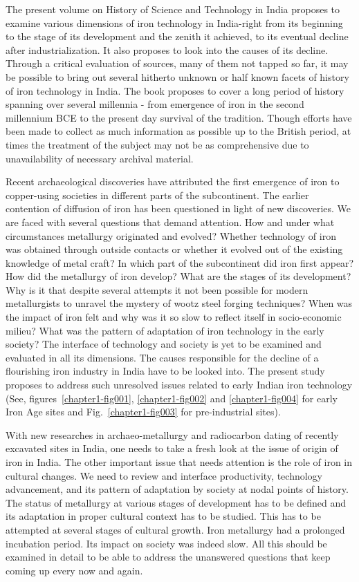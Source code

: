 The present volume on History of Science and Technology in India proposes to examine various dimensions of iron technology in India-right from its beginning to the stage of its development and the zenith it achieved, to its eventual decline after industrialization. It also proposes to look into the causes of its decline. Through a critical evaluation of sources, many of them not tapped so far, it may be possible to bring out several hitherto unknown or half known facets of history of iron technology in India. The book proposes to cover a long period of history spanning over several millennia - from emergence of iron in the second millennium BCE to the present day survival of the tradition. Though efforts have been made to collect as much information as possible up to the British period, at times the treatment of the subject may not be as comprehensive due to unavailability of necessary archival material.

Recent archaeological discoveries have attributed the first emergence of iron to copper-using societies in different parts of the subcontinent. The earlier contention of diffusion of iron has been questioned in light of new discoveries. We are faced with several questions that demand attention. How and under what circumstances metallurgy originated and evolved? Whether technology of iron was obtained through outside contacts or whether it evolved out of the existing knowledge of metal craft? In which part of the subcontinent did iron first appear? How did the metallurgy of iron develop? What are the stages of its development? Why is it that despite several attempts it not been possible for modern metallurgists to unravel the mystery of wootz steel forging techniques? When was the impact of iron felt and why was it so slow to reflect itself in socio-economic milieu? What was the pattern of adaptation of iron technology in the early society? The interface of technology and society is yet to be examined and evaluated in all its dimensions. The causes responsible for the decline of a flourishing iron industry in India have to be looked into. The present study proposes to address such unresolved issues related to early Indian iron technology (See, figures~{\ref{chapter1-fig001}}, \ref{chapter1-fig002} and \ref{chapter1-fig004} for early Iron Age sites and Fig.~\ref{chapter1-fig003} for pre-industrial sites). 

With new researches in archaeo-metallurgy and radiocarbon dating of recently excavated sites in India, one needs to take a fresh look at the issue of origin of iron in India. The other important issue that needs attention is the role of iron in cultural changes. We need to review and interface productivity, technology advancement, and its pattern of adaptation by society at nodal points of history. The status of metallurgy at various stages of development has to be defined and its adaptation in proper cultural context has to be studied. This has to be attempted at several stages of cultural growth. Iron metallurgy had a prolonged incubation period. Its impact on society was indeed slow. All this should be examined in detail to be able to address the unanswered questions that keep coming up every now and again. 

